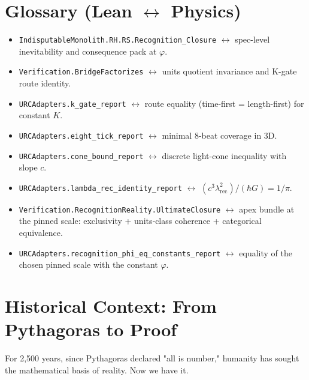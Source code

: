 \documentclass[11pt,a4paper,twoside]{article}
\numberwithin{equation}{section}
\theoremstyle{customthm}
\theoremstyle{customdef}
\theoremstyle{customrem}
\begin{document}
\section*{Glossary (Lean \texorpdfstring{$\leftrightarrow$}{↔} Physics)}\label{sec:glossary}
\begin{itemize}[leftmargin=*]
  \item \texttt{IndisputableMonolith.RH.RS.Recognition\_Closure} $\leftrightarrow$ spec-level inevitability and consequence pack at $\varphi$.
  \item \texttt{Verification.BridgeFactorizes} $\leftrightarrow$ units quotient invariance and K-gate route identity.
  \item \texttt{URCAdapters.k\_gate\_report} $\leftrightarrow$ route equality (time-first = length-first) for constant $K$.
  \item \texttt{URCAdapters.eight\_tick\_report} $\leftrightarrow$ minimal $8$-beat coverage in 3D.
  \item \texttt{URCAdapters.cone\_bound\_report} $\leftrightarrow$ discrete light-cone inequality with slope $c$.
  \item \texttt{URCAdapters.lambda\_rec\_identity\_report} $\leftrightarrow$ $(c^3\lambda_{\mathrm{rec}}^2)/(\hbar G)=1/\pi$.
  \item \texttt{Verification.RecognitionReality.UltimateClosure} $\leftrightarrow$ apex bundle at the pinned scale: exclusivity + units‑class coherence + categorical equivalence.
  \item \texttt{URCAdapters.recognition\_phi\_eq\_constants\_report} $\leftrightarrow$ equality of the chosen pinned scale with the constant $\varphi$.
\end{itemize}

\section*{Historical Context: From Pythagoras to Proof}\label{sec:history}

For 2,500 years, since Pythagoras declared "all is number," humanity has sought the mathematical basis of reality. Now we have it.
\end{document}

